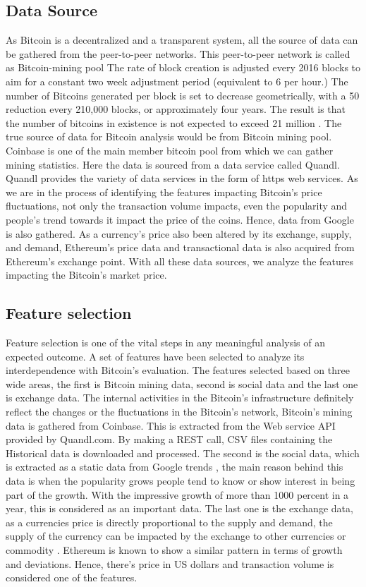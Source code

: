 \documentclass[sigconf]{acmart}
\begin{document}
 
 \subsection{Data Source}
 As Bitcoin is a decentralized and a transparent system, all the source of data can be gathered from the peer-to-peer networks. This peer-to-peer network is called as Bitcoin-mining pool \cite{1:online}
 The rate of block creation is adjusted every 2016 blocks to aim for a constant two week adjustment period (equivalent to 6 per hour.) The number of Bitcoins generated per block is set to decrease geometrically, with a 50 reduction every 210,000 blocks, or approximately four years. The result is that the number of bitcoins in existence is not expected to exceed 21 million \cite{2:online}.
The true source of data for Bitcoin analysis would be from Bitcoin mining pool. Coinbase is one of the main member bitcoin pool from which we can gather mining statistics. Here the data is sourced from a data service called Quandl. Quandl provides the variety of data services in the form of https web services. As we are in the process of identifying the features impacting Bitcoin's price fluctuations, not only the transaction volume impacts, even the popularity and people's trend towards it impact the price of the coins. Hence, data from Google is also gathered. As a currency's price also been altered by its exchange, supply, and demand, Ethereum's price data and transactional data is also acquired from Ethereum's exchange point.
With all these data sources, we analyze the features impacting the Bitcoin's market price. 
 
 
 \subsection{Feature selection}
 Feature selection is one of the vital steps in any meaningful analysis of an expected outcome. A set of features have been selected to analyze its interdependence with Bitcoin's evaluation. The features selected based on three wide areas, the first is Bitcoin mining data, second is social data and the last one is exchange data.
 The internal activities in the Bitcoin's infrastructure definitely reflect the changes or the fluctuations in the Bitcoin's network, Bitcoin's mining data is gathered from Coinbase. This is extracted from the Web service API provided by Quandl.com\cite{3:online}. By making a REST call, CSV files containing the Historical data is downloaded and processed.
 The second is the social data, which is extracted as a static data from Google trends \cite{google:online}, the main reason behind this data is when the popularity grows people tend to know or show interest in being part of the growth. With the impressive growth of more than 1000 percent in a year, this is considered as an important data.
 The last one is the exchange data, as a currencies price is directly proportional to the supply and demand, the supply of the currency can be impacted by the exchange to other currencies or commodity \cite{4:online}. Ethereum is known to show a similar pattern in terms of growth and deviations\cite{Ethereum:online}. Hence, there's price in US dollars and transaction volume is considered one of the features.
\end{document}
